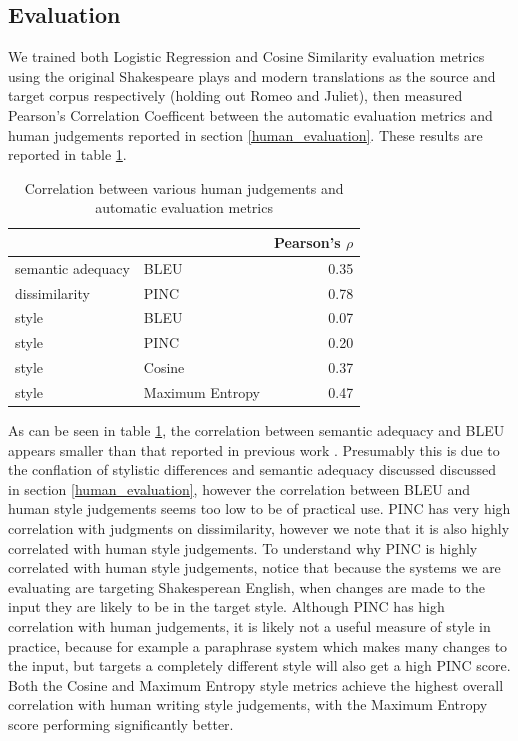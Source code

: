 \documentclass[10pt,a5paper,twoside]{article}
\begin{document}
\subsection{Evaluation}
We trained both Logistic Regression and Cosine Similarity evaluation metrics using the original Shakespeare plays and modern translations as
the source and target corpus respectively (holding out Romeo and Juliet), then measured Pearson's Correlation Coefficent between the automatic
evaluation metrics and human judgements reported in section \ref{human_evaluation}.  These results are reported in table \ref{correlation}.

\begin{table}
  \begin{center}
  \begin{tabular}{|l|l|r|}
    \hline
    & & Pearson's $\rho$ \\
    \hline
    \hline
    semantic adequacy & BLEU & 0.35 \\
    \hline
    dissimilarity & PINC & 0.78 \\
    \hline
    style & BLEU & 0.07 \\
    \hline
    style & PINC & 0.20 \\
    \hline
    style & Cosine & 0.37 \\
    \hline
    style & Maximum Entropy & 0.47 \\
    \hline
  \end{tabular}
  \end{center}
  \caption{Correlation between various human judgements and automatic evaluation metrics}
  \label{correlation}
\end{table}

As can be seen in table \ref{correlation}, the correlation between semantic adequacy and BLEU appears smaller than that reported in previous work \cite{chen11}.  Presumably this is
due to the conflation of stylistic differences and semantic adequacy discussed discussed in section \ref{human_evaluation}, however the correlation between BLEU and human style
judgements seems too low to be of practical use.  PINC has very high correlation with judgments on dissimilarity, however we note that it is also highly correlated with human style
judgements.  To understand why PINC is highly correlated with human style judgements, notice that because the systems we are evaluating are targeting Shakesperean English, when changes
are made to the input they are likely to be in the target style.  Although PINC has high correlation with human judgements, it is likely not a useful measure of style in practice,
because for example a paraphrase system which makes many changes to the input, but targets a completely different style will also get a high PINC score.  
Both the Cosine and Maximum Entropy style metrics achieve the highest overall correlation with human writing style judgements, with the Maximum Entropy score performing significantly better.
\end{document}
